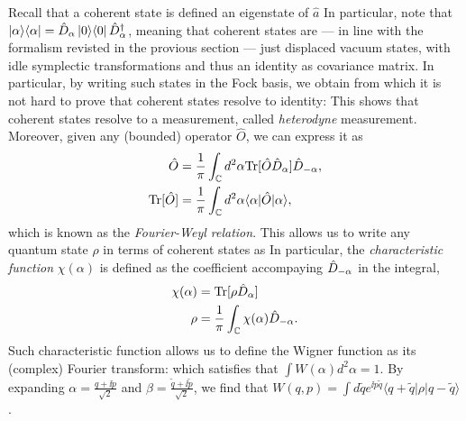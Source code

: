 Recall that a coherent state is defined an eigenstate of $\hat{a}$
In particular, note that $\proj{\alpha} = \weyl{\alpha}\proj{0}\weyl{\alpha}^\dagger$, meaning that coherent states are --- in line with the formalism revisted in the provious section --- just displaced vacuum states, with idle symplectic transformations and thus an identity as covariance matrix. In particular, by writing such states in the Fock basis, we obtain
from which it is not hard to prove that coherent states resolve to identity:
This shows that coherent states resolve to a measurement, called \textit{heterodyne} measurement. Moreover, given any (bounded) operator $\hat{O}$, we can express it as
\begin{align}\label{eq:trW}
\hat{O} &= \frac{1}{\pi} \int_{\mathbb{C}}d^2\alpha \text{Tr}[\hat{O} \hat{D}_{\alpha} ]\hat{D}_{-\alpha},\\
\text{Tr}[\hat{O}] &= \frac{1}{\pi}\int_\mathbb{C} d^2\alpha \langle\alpha|\hat{O}|\alpha\rangle,
\end{align}
which is known as the \textit{Fourier-Weyl relation}. This allows us to write any quantum state $\rho$ in terms of coherent states as
 In particular, the \textit{characteristic function} $\chi(\alpha)$ is defined as the coefficient accompaying $\hat{D}_{-\alpha}$ in the integral, 
\begin{align}
\chi(\alpha) &= \text{Tr}[ \rho \hat{D}_{\alpha}]\\
\rho &= \frac{1}{\pi} \int_{\mathbb{C}} \chi(\alpha)\hat{D}_{-\alpha}.
\end{align}
Such characteristic function allows us to define%
the Wigner function as its (complex) Fourier transform:
which satisfies that $\int W(\alpha) d^2 \alpha = 1$. By expanding $\alpha = \frac{q + \ii p}{\sqrt{2}} $ and $ \beta = \frac{\tilde{q} + \ii \tilde{p}}{\sqrt{2}}$, we find that $W(q,p) = \int d\tilde{q} e^{\ii p \tilde{q}} \langle q + \tilde{q}| \rho | q - \tilde{q}\rangle$.
